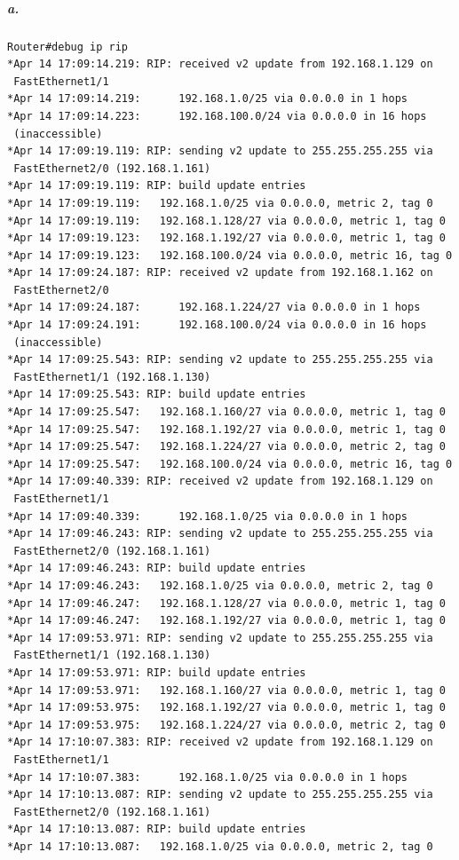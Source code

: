 \subparagraph{a.}
\begin{verbatim}
Router#debug ip rip
*Apr 14 17:09:14.219: RIP: received v2 update from 192.168.1.129 on
 FastEthernet1/1
*Apr 14 17:09:14.219:      192.168.1.0/25 via 0.0.0.0 in 1 hops
*Apr 14 17:09:14.223:      192.168.100.0/24 via 0.0.0.0 in 16 hops 
 (inaccessible)
*Apr 14 17:09:19.119: RIP: sending v2 update to 255.255.255.255 via
 FastEthernet2/0 (192.168.1.161)
*Apr 14 17:09:19.119: RIP: build update entries
*Apr 14 17:09:19.119: 	192.168.1.0/25 via 0.0.0.0, metric 2, tag 0
*Apr 14 17:09:19.119: 	192.168.1.128/27 via 0.0.0.0, metric 1, tag 0
*Apr 14 17:09:19.123: 	192.168.1.192/27 via 0.0.0.0, metric 1, tag 0
*Apr 14 17:09:19.123: 	192.168.100.0/24 via 0.0.0.0, metric 16, tag 0
*Apr 14 17:09:24.187: RIP: received v2 update from 192.168.1.162 on
 FastEthernet2/0
*Apr 14 17:09:24.187:      192.168.1.224/27 via 0.0.0.0 in 1 hops
*Apr 14 17:09:24.191:      192.168.100.0/24 via 0.0.0.0 in 16 hops 
 (inaccessible)
*Apr 14 17:09:25.543: RIP: sending v2 update to 255.255.255.255 via
 FastEthernet1/1 (192.168.1.130)
*Apr 14 17:09:25.543: RIP: build update entries
*Apr 14 17:09:25.547: 	192.168.1.160/27 via 0.0.0.0, metric 1, tag 0
*Apr 14 17:09:25.547: 	192.168.1.192/27 via 0.0.0.0, metric 1, tag 0
*Apr 14 17:09:25.547: 	192.168.1.224/27 via 0.0.0.0, metric 2, tag 0
*Apr 14 17:09:25.547: 	192.168.100.0/24 via 0.0.0.0, metric 16, tag 0
*Apr 14 17:09:40.339: RIP: received v2 update from 192.168.1.129 on
 FastEthernet1/1
*Apr 14 17:09:40.339:      192.168.1.0/25 via 0.0.0.0 in 1 hops
*Apr 14 17:09:46.243: RIP: sending v2 update to 255.255.255.255 via
 FastEthernet2/0 (192.168.1.161)
*Apr 14 17:09:46.243: RIP: build update entries
*Apr 14 17:09:46.243: 	192.168.1.0/25 via 0.0.0.0, metric 2, tag 0
*Apr 14 17:09:46.247: 	192.168.1.128/27 via 0.0.0.0, metric 1, tag 0
*Apr 14 17:09:46.247: 	192.168.1.192/27 via 0.0.0.0, metric 1, tag 0
*Apr 14 17:09:53.971: RIP: sending v2 update to 255.255.255.255 via
 FastEthernet1/1 (192.168.1.130)
*Apr 14 17:09:53.971: RIP: build update entries
*Apr 14 17:09:53.971: 	192.168.1.160/27 via 0.0.0.0, metric 1, tag 0
*Apr 14 17:09:53.975: 	192.168.1.192/27 via 0.0.0.0, metric 1, tag 0
*Apr 14 17:09:53.975: 	192.168.1.224/27 via 0.0.0.0, metric 2, tag 0
*Apr 14 17:10:07.383: RIP: received v2 update from 192.168.1.129 on
 FastEthernet1/1
*Apr 14 17:10:07.383:      192.168.1.0/25 via 0.0.0.0 in 1 hops
*Apr 14 17:10:13.087: RIP: sending v2 update to 255.255.255.255 via
 FastEthernet2/0 (192.168.1.161)
*Apr 14 17:10:13.087: RIP: build update entries
*Apr 14 17:10:13.087: 	192.168.1.0/25 via 0.0.0.0, metric 2, tag 0

\end{verbatim}
